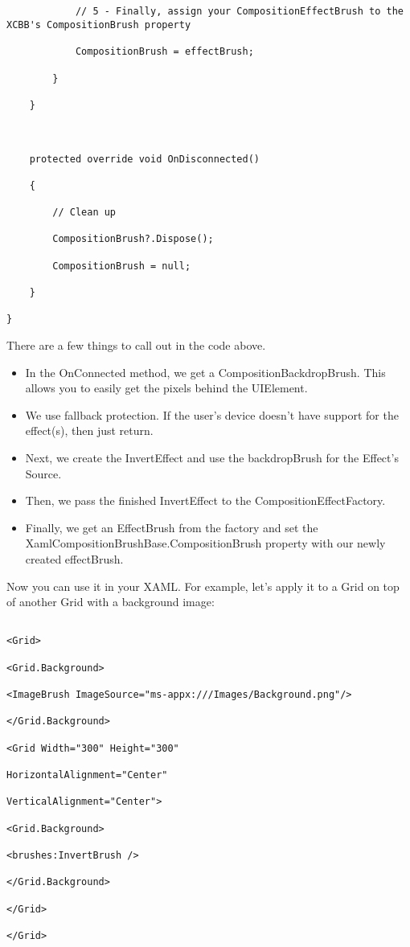 \begin{lstlisting}[style=CSharpStyle]
			
			
			// 5 - Finally, assign your CompositionEffectBrush to the XCBB's CompositionBrush property
			
			CompositionBrush = effectBrush;
			
		}
		
	}
	
	
	
	protected override void OnDisconnected()
	
	{
		
		// Clean up
		
		CompositionBrush?.Dispose();
		
		CompositionBrush = null;
		
	}
	
}
\end{lstlisting}

There are a few things to call out in the code above.

\begin{itemize}
	\item In the OnConnected method, we get a CompositionBackdropBrush. This allows you to easily get the pixels behind the UIElement.
	\item We use fallback protection. If the user’s device doesn’t have support for the effect(s), then just return.
	\item Next, we create the InvertEffect and use the backdropBrush for the Effect’s Source.
	\item Then, we pass the finished InvertEffect to the CompositionEffectFactory.
	\item Finally, we get an EffectBrush from the factory and set the XamlCompositionBrushBase.CompositionBrush property with our newly created effectBrush.
\end{itemize}

Now you can use it in your XAML. For example, let’s apply it to a Grid on top of another Grid with a background image:


\begin{lstlisting}[style=XamlStyle]

<Grid>

<Grid.Background>

<ImageBrush ImageSource="ms-appx:///Images/Background.png"/>

</Grid.Background>

<Grid Width="300" Height="300" 

HorizontalAlignment="Center"

VerticalAlignment="Center">

<Grid.Background>

<brushes:InvertBrush />

</Grid.Background>

</Grid>

</Grid>
\end{lstlisting}


